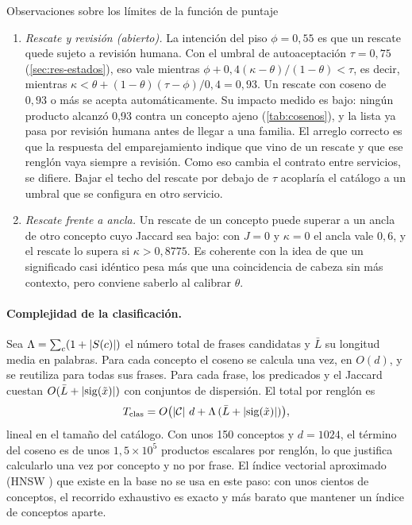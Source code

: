 \begin{hallazgo}{Observaciones sobre los límites de la función de puntaje}
\begin{enumerate}
  \item \emph{Rescate y revisión (abierto).} La intención del piso
        $\phi=0{,}55$ es que un rescate quede sujeto a revisión humana. Con el
        umbral de autoaceptación $\tau=0{,}75$ (\cref{sec:res-estados}), eso
        vale mientras $\phi+0{,}4(\kappa-\theta)/(1-\theta)<\tau$, es decir,
        mientras $\kappa<\theta+(1-\theta)(\tau-\phi)/0{,}4=0{,}93$. Un rescate
        con coseno de $0{,}93$ o más se acepta automáticamente. Su impacto
        medido es bajo: ningún producto alcanzó 0,93 contra un concepto
        ajeno (\cref{tab:cosenos}), y la lista ya pasa por revisión humana
        antes de llegar a una familia. El arreglo correcto es que la respuesta
        del emparejamiento indique que vino de un rescate y que ese renglón vaya
        siempre a revisión. Como eso cambia el contrato entre servicios, se
        difiere. Bajar el techo del rescate por debajo de $\tau$ acoplaría el
        catálogo a un umbral que se configura en otro servicio.
  \item \emph{Rescate frente a ancla.} Un rescate de un concepto puede superar
        a un ancla de otro concepto cuyo Jaccard sea bajo: con $J=0$ y
        $\kappa=0$ el ancla vale $0{,}6$, y el rescate lo supera si
        $\kappa>0{,}8775$. Es coherente con la idea de que un significado casi
        idéntico pesa más que una coincidencia de cabeza sin más contexto,
        pero conviene saberlo al calibrar $\theta$.
\end{enumerate}
\end{hallazgo}

\paragraph{Complejidad de la clasificación.} Sea $\Lambda=\sum_{c}(1+\left\lvert S(c) \right\rvert)$
el número total de frases candidatas y $\bar L$ su longitud media en palabras.
Para cada concepto el coseno se calcula una vez, en $O(d)$, y se reutiliza
para todas sus frases. Para cada frase, los predicados y el Jaccard cuestan
$O(\bar L+\left\lvert \operatorname{sig}(\tilde x) \right\rvert)$ con conjuntos de dispersión. El total por
renglón es
\[
  T_{\mathrm{clas}} = O\bigl(\left\lvert \mathcal{C} \right\rvert\,d + \Lambda\,(\bar L+\left\lvert \operatorname{sig}(\tilde x) \right\rvert)\bigr),
\]
lineal en el tamaño del catálogo. Con unos 150 conceptos y $d=1024$, el
término del coseno es de unos $1{,}5\times10^5$ productos escalares por
renglón, lo que justifica calcularlo una vez por concepto y no por frase. El
índice vectorial aproximado (HNSW \cite{malkov2018hnsw}) que existe en la base
no se usa en este paso: con unos cientos de conceptos, el recorrido exhaustivo
es exacto y más barato que mantener un índice de conceptos aparte.

